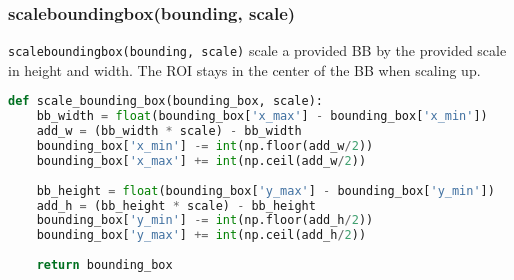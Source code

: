 \subsubsection{scale{\textunderscore}bounding{\textunderscore}box(bounding{\textunderscore}, scale)}
\texttt{scale{\textunderscore}bounding{\textunderscore}box(bounding{\textunderscore}, scale)} scale a provided BB by the provided scale in height and width. The ROI stays in the center of the BB when scaling up.

\begin{lstlisting}[frame=single,language=python]
def scale_bounding_box(bounding_box, scale):
	bb_width = float(bounding_box['x_max'] - bounding_box['x_min'])
	add_w = (bb_width * scale) - bb_width
	bounding_box['x_min'] -= int(np.floor(add_w/2))
	bounding_box['x_max'] += int(np.ceil(add_w/2))
	
	bb_height = float(bounding_box['y_max'] - bounding_box['y_min'])
	add_h = (bb_height * scale) - bb_height
	bounding_box['y_min'] -= int(np.floor(add_h/2))
	bounding_box['y_max'] += int(np.ceil(add_h/2))
	
	return bounding_box
\end{lstlisting}
